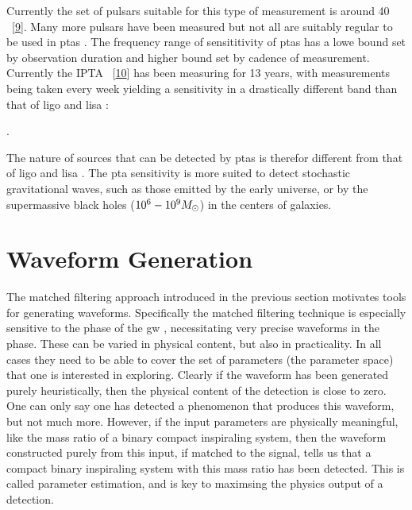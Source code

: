 \documentclass[
  10pt,
  a4paper,
  DIV=11,
  numbers=noendperiod,
  twoside]{scrreprt}
\let\[\relax \let\]\relax %
\DeclareRobustCommand{\[}{\begin{equation}}
\DeclareRobustCommand{\]}{\end{equation}}
\begin{document}
Currently the set of pulsars suitable for this type of measurement is
around 40 ~{[}\protect\hyperlink{ref-Maiorano:2021}{9}{]}. Many more
pulsars have been measured but not all are suitably regular to be used
in \glspl{pta} . The frequency range of sensititivity of \glspl{pta} has
a lowe bound set by observation duration and higher bound set by cadence
of measurement. Currently the IPTA
~{[}\protect\hyperlink{ref-Hobbs:2009yy}{10}{]} has been measuring for
13 years, with measurements being taken every week yielding a
sensitivity in a drastically different band than that of \gls{ligo} and
\gls{lisa} :

\[
.
\]

The nature of sources that can be detected by \glspl{pta} is therefor
different from that of \gls{ligo} and \gls{lisa} . The \gls{pta}
sensitivity is more suited to detect stochastic gravitational waves,
such as those emitted by the early universe, or by the supermassive
black holes (\(10^6-10^9M_\odot\)) in the centers of
galaxies.


\hypertarget{waveform-generation}{%
\chapter{Waveform Generation}\label{waveform-generation}}

The matched filtering approach introduced in the previous section
motivates tools for generating waveforms. Specifically the matched
filtering technique is especially sensitive to the phase of the \gls{gw}
, necessitating very precise waveforms in the phase. These can be varied
in physical content, but also in practicality. In all cases they need to
be able to cover the set of parameters (the parameter space) that one is
interested in exploring. Clearly if the waveform has been generated
purely heuristically, then the physical content of the detection is
close to zero. One can only say one has detected a phenomenon that
produces this waveform, but not much more. However, if the input
parameters are physically meaningful, like the mass ratio of a binary
compact inspiraling system, then the waveform constructed purely from
this input, if matched to the signal, tells us that a compact binary
inspiraling system with this mass ratio has been detected. This is
called parameter estimation, and is key to maximsing the physics output
of a detection.
\end{document}
